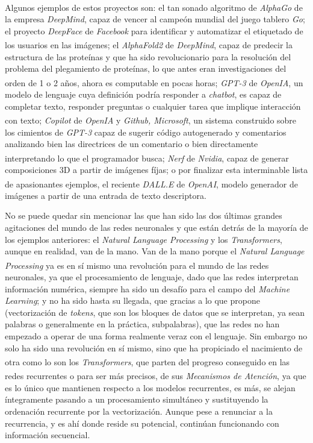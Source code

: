 Algunos ejemplos de estos proyectos son:
el tan sonado algoritmo de \textit{AlphaGo}\textsuperscript{\cite{alphago}}
de la empresa \textit{DeepMind},
capaz de vencer al campeón mundial del juego tablero \textit{Go}; el
proyecto \textit{DeepFace} de \textit{Facebook} para identificar y automatizar
el etiquetado de los usuarios en las imágenes; el \textit{AlphaFold2}
\textsuperscript{\cite{alphafold}} de
\textit{DeepMind}, capaz de predecir la estructura de las proteínas y que
ha sido revolucionario para la resolución del problema del plegamiento de
proteínas, lo que antes eran investigaciones del orden de 1 o 2 años, ahora
es computable en pocas horas; \textit{GPT-3}
\textsuperscript{\cite{openai}} de \textit{OpenIA},
un modelo de lenguaje cuya definición podría responder a \textit{chatbot},
es capaz de completar texto, responder preguntas o cualquier tarea que
implique interacción con texto; \textit{Copilot}\textsuperscript{\cite{ghcopilot}}
de \textit{OpenIA}
y \textit{Github, Microsoft}, un sistema construido sobre los cimientos de
\textit{GPT-3} capaz de sugerir código autogenerado
y comentarios analizando bien las directrices de un comentario o bien
directamente interpretando lo que el programador busca; \textit{Nerf}\textsuperscript{\cite{nerfs}}
de \textit{Nvidia}, capaz de generar composiciones 3D a partir de
imágenes fíjas; o por finalizar esta interminable lista de apasionantes
ejemplos, el reciente \textit{DALL.E}\textsuperscript{\cite{openai}} de \textit{OpenAI}, modelo generador
de imágenes a partir de una entrada de texto descriptora.

No se puede quedar sin mencionar las que han sido las dos últimas grandes
agitaciones del mundo de las redes neuronales y que están detrás de la
mayoría de los ejemplos anteriores: el \textit{Natural Language Processing}
y los \textit{Transformers}, aunque en realidad, van de la mano.
Van de la mano porque el \textit{Natural Language Processing}\textsuperscript{\cite{nlp}}
ya es
en sí mismo una revolución para el mundo de las redes neuronales, ya que
el procesamiento de lenguaje, dado que las redes interpretan información
numérica, siempre ha sido un desafío para el campo del \textit{Machine Learning};
y no ha sido hasta su llegada, que gracias a lo que propone (vectorización de
\textit{tokens}, que son los bloques de datos que se interpretan, ya sean
palabras o generalmente en la práctica, subpalabras), que las redes
no han empezado a operar de una forma realmente veraz con el lenguaje.
Sin embargo no solo ha sido una revolución en sí mismo, sino que ha
propiciado el nacimiento de otra como lo son los \textit{Transformers}\textsuperscript{\cite{transformers}},
que parten del progreso conseguido en las redes recurrentes o para ser más
precisos, de sus \textit{Mecanismos de Atención}\textsuperscript{\cite{aiayn}},
ya que es lo único que
mantienen respecto a los modelos recurrentes, es más, se alejan íntegramente
pasando a un procesamiento simultáneo y sustituyendo la ordenación recurrente
por la vectorización. Aunque pese a renunciar a la recurrencia, y es ahí donde
reside su potencial, continúan funcionando con información secuencial.

